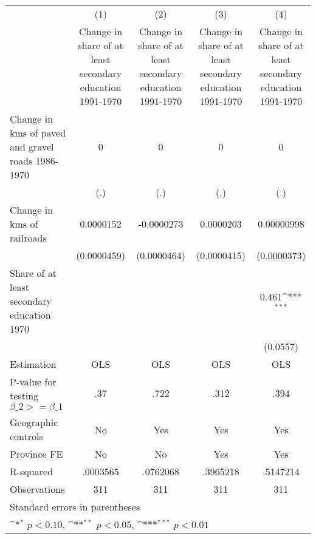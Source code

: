 {
\def\sym#1{\ifmmode^{#1}\else\(^{#1}\)\fi}
\begin{tabular}{l*{4}{c}}
\hline\hline
                    &\multicolumn{1}{c}{(1)}&\multicolumn{1}{c}{(2)}&\multicolumn{1}{c}{(3)}&\multicolumn{1}{c}{(4)}\\
                    &\multicolumn{1}{c}{Change in share of at least secondary education 1991-1970}&\multicolumn{1}{c}{Change in share of at least secondary education 1991-1970}&\multicolumn{1}{c}{Change in share of at least secondary education 1991-1970}&\multicolumn{1}{c}{Change in share of at least secondary education 1991-1970}\\
\hline
Change in kms of paved and gravel roads 1986-1970&           0         &           0         &           0         &           0         \\
                    &         (.)         &         (.)         &         (.)         &         (.)         \\
[1em]
Change in kms of railroads&   0.0000152         &  -0.0000273         &   0.0000203         &  0.00000998         \\
                    & (0.0000459)         & (0.0000464)         & (0.0000415)         & (0.0000373)         \\
[1em]
Share of at least secondary education 1970&                     &                     &                     &       0.461\sym{***}\\
                    &                     &                     &                     &    (0.0557)         \\
\hline
Estimation          &         OLS         &         OLS         &         OLS         &         OLS         \\
P-value for testing $\beta\_2 >= \beta\_1$&         .37         &        .722         &        .312         &        .394         \\
Geographic controls &          No         &         Yes         &         Yes         &         Yes         \\
Province FE         &          No         &          No         &         Yes         &         Yes         \\
R-squared           &    .0003565         &    .0762068         &    .3965218         &    .5147214         \\
Observations        &         311         &         311         &         311         &         311         \\
\hline\hline
\multicolumn{5}{l}{\footnotesize Standard errors in parentheses}\\
\multicolumn{5}{l}{\footnotesize \sym{*} \(p<0.10\), \sym{**} \(p<0.05\), \sym{***} \(p<0.01\)}\\
\end{tabular}
}
